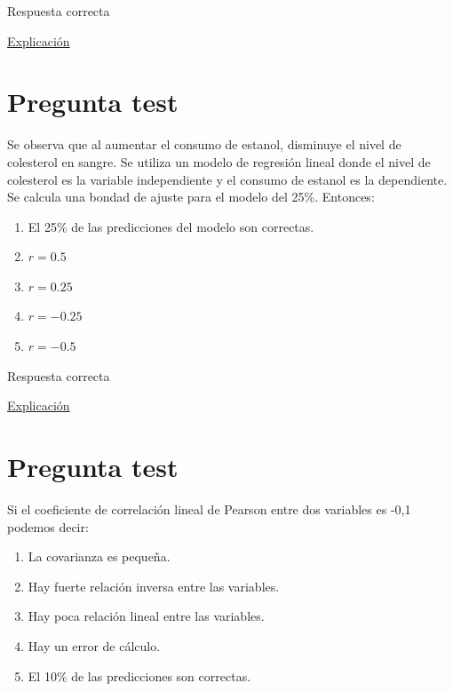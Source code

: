 \documentclass[
]{book}
\providecommand{\tightlist}{%
  \setlength{\itemsep}{0pt}\setlength{\parskip}{0pt}}
\begin{document}
Respuesta correcta

\href{https://www.feedingthemachine.ai/regresion-lineal-y-los-outliers/}{Explicación}

\hypertarget{pregunta-test-117}{%
\section{Pregunta test}\label{pregunta-test-117}}

Se observa que al aumentar el consumo de estanol, disminuye el nivel de colesterol en sangre. Se utiliza un modelo de regresión lineal donde el nivel de colesterol es la variable independiente y el consumo de estanol es la dependiente. Se calcula una bondad de ajuste para el modelo del 25\%. Entonces:

\begin{enumerate}
\def\labelenumi{\alph{enumi})}
\tightlist
\item
  El 25\% de las predicciones del modelo son correctas.
\item
  \(r= 0.5\)
\item
  \(r= 0.25\)
\item
  \(r= -0.25\)
\item
  \(r= -0.5\)
\end{enumerate}

Respuesta correcta

\href{https://blog.minitab.com/es/analisis-de-regresion-como-puedo-interpretar-el-r-cuadrado-y-evaluar-la-bondad-de-ajuste}{Explicación}

\hypertarget{pregunta-test-118}{%
\section{Pregunta test}\label{pregunta-test-118}}

Si el coeficiente de correlación lineal de Pearson entre dos variables es -0,1 podemos decir:

\begin{enumerate}
\def\labelenumi{\alph{enumi})}
\tightlist
\item
  La covarianza es pequeña.
\item
  Hay fuerte relación inversa entre las variables.
\item
  Hay poca relación lineal entre las variables.
\item
  Hay un error de cálculo.
\item
  El 10\% de las predicciones son correctas.
\end{enumerate}
\end{document}
